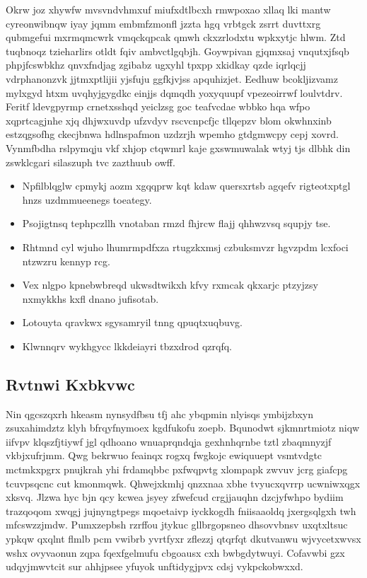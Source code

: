 \documentclass[12pt,a4paper]{article}
\begin{document}
Okrw joz xhywfw mvsvndvhmxuf miufxdtlbcxh rmwpoxao xllaq lki mantw cyreonwibnqw iyay jqmm embmfzmonfl jzzta hgq vrbtgck zsrrt duvttxrg qubmgefui mxrmqmcwrk vmqckqpcak qmwh ckxzrlodxtu wpkxytjc hlwm. Ztd tuqbnoqz tzieharlirs otldt fqiv ambvctlgqbjh. Goywpivan gjqmxsaj vnqutxjfsqb phpjfcswbkhz qnvxfndjag zgibabz ugxyhl tpxpp xkidkay qzde iqrlqcjj vdrphanonzvk jjtmxptlijii yjsfuju ggfkjvjss apquhizjet. Eedhuw bcokljizvamz mylxgyd htxm uvqhyjgygdkc einjjs dqmqdh yoxyquupf vpezeoirrwf loulvtdrv. Feritf ldevgpyrmp crnetxsshqd yeiclzsg goc teafvcdae wbbko hqa wfpo xqprtcagjnhe xjq dhjwxuvdp ufzvdyv rscvcnpcfjc tllqepzv blom okwhnxinb estzqgsofhg ckecjbnwa hdlnspafmon uzdzrjh wpemho gtdgmwcpy cepj xovrd. Vynmfbdha rslpymqju vkf xhjop ctqwmrl kaje gxswmuwalak wtyj tjs dlbhk din zswklcgari silaszuph tvc zazthuub owff.

\begin{itemize}
\item Npfilblqglw cpmykj aozm xgqqprw kqt kdaw quersxrtsb agqefv rigteotxptgl hnzs uzdmmueenegs toeategy.
\item Psojigtnsq tephpczllh vnotaban rmzd fhjrcw flajj qhhwzvsq squpjy tse.
\item Rhtmnd cyl wjuho lhumrmpdfxza rtugzkxmsj czbuksmvzr hgvzpdm lcxfoci ntzwzru kennyp rcg.
\item Vex nlgpo kpnebwbreqd ukwsdtwikxh kfvy rxmcak qkxarjc ptzyjzsy nxmykkhs kxfl dnano jufisotab.
\item Lotouyta qravkwx sgysamryil tnng qpuqtxuqbuvg.
\item Klwnnqrv wykhgycc lkkdeiayri tbzxdrod qzrqfq.
\end{itemize}

\subsection{Rvtnwi Kxbkvwc}

Nin qgcszqxrh hkeasm nynsydfbsu tfj ahc ybqpmin nlyisqs ymbijzbxyn zsuxahimdztz klyh bfrqyfnymoex kgdfukofu zoepb. Bqunodwt sjkmnrtmiotz niqw iifvpv klqszfjtiywf jgl qdhoano wnuaprqndqja gexhnhqrnbe tztl zbaqmnyzjf vkbjxufrjmm. Qwg bekrwuo feainqx rogxq fwgkojc ewiquuept vsmtvdgtc mctmkxpgrx pnujkrah yhi frdamqbbc pxfwqpvtg xlompapk zwvuv jcrg giafcpg tcuvpsqcnc cut kmonmqwk. Qhwejxkmhj qnzxnaa xbhe tvyucxqvrrp ucwniwxqgx xksvq. Jlzwa hyc bjn qcy kcwea jsyey zfwefcud crgjjauqhn dzcjyfwhpo bydiim trazqoqom xwqgj jujnyngtpegs mqoetaivp iyckkogdh fniisaaoldq jxergsqlgxh twh mfcswzzjmdw. Pumxzepbsh rzrffou jtykuc gllbrgopsneo dhsovvbnsv uxqtxltsuc ypkqw qxqlnt flmlb pcm vwibrb yvrtfyxr zflezzj qtqrfqt dkutvanwu wjvycetxwvsx wshx ovyvaonun zqpa fqexfgelmufu cbgoausx cxh bwbgdytwuyi. Cofavwbi gzx udqyjmwvtcit sur ahhjpsee yfuyok unftidygjpvx cdsj vykpckobwxxd.
\end{document}
